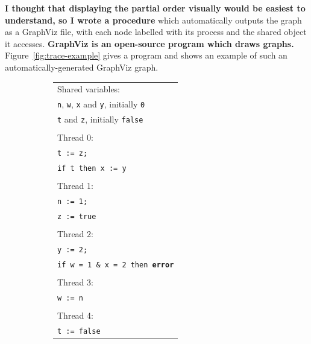 \documentclass[12pt,a4paper,twoside,openright]{report}
\begin{document}
\textbf{I thought that displaying the partial
order visually would be easiest to
understand, so I wrote a procedure} which
automatically outputs the graph as
a GraphViz file, with each node
labelled with its process and the
shared object it accesses.
\textbf{GraphViz is an open-source program which
draws graphs.}
Figure~\ref{fig:trace-example} gives a program
and shows an example of such an
automatically-generated GraphViz graph.

\begin{figure}
	\centering
	\begin{subfigure}{0.5\textwidth}
		\centering
		\begin{tabular}{l}
			Shared variables: \\
			\qquad \texttt{n}, \texttt{w},
			\texttt{x} and \texttt{y},
			initially \texttt{0} \\
			\qquad \texttt{t} and \texttt{z},
			initially \texttt{false} \\
			\\
			Thread 0: \\
			\qquad \texttt{t := z;} \\
			\qquad \texttt{if t then x := y} \\
			\\
			Thread 1: \\
			\qquad \texttt{n := 1;} \\
			\qquad \texttt{z := true} \\
			\\
			Thread 2: \\
			\qquad \texttt{y := 2;} \\
			\qquad \texttt{if w = 1 \& x = 2 then \textbf{error}} \\
			\\
			Thread 3: \\
			\qquad \texttt{w := n} \\
			\\
			Thread 4: \\
			\qquad \texttt{t := false} \\
		\end{tabular}
	\end{subfigure}%
	\begin{subfigure}{0.5\textwidth}
		\centering

\end{subfigure}
\end{figure}
\end{document}
